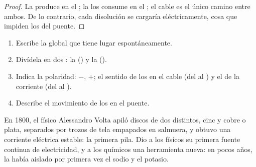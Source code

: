 \begin{proof}
La  produce  en el ; la  los consume en
el ; el cable es el único camino entre ambos. De lo contrario, cada
disolución se cargaría eléctricamente, cosa que impiden los  del
puente.
\end{proof}

\begin{method}\label{met:g12:cells-and-electrolysis:describe}
\begin{enumerate}
  \item Escribe la  global que tiene lugar espontáneamente.
  \item Divídela en dos : la  () y la
         ().
  \item Indica la polaridad:  $-$,  $+$; el sentido de los
         en el cable (del  al ) y el de la corriente
        (del  al ).
  \item Describe el movimiento de los  en el puente.
\end{enumerate}
\end{method}


\begin{history}
En 1800, el físico Alessandro Volta apiló discos de dos 
distintos, cinc y cobre o plata, separados por trozos de tela empapados
en salmuera, y obtuvo una corriente eléctrica estable: la primera pila.
Dio a los físicos su primera fuente continua de electricidad, y a los
químicos una herramienta nueva: en pocos años, la  había
aislado por primera vez el sodio y el potasio.
\end{history}

